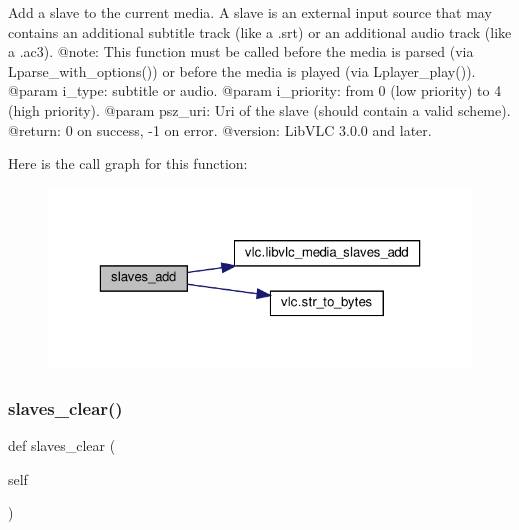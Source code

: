 \begin{DoxyVerb}Add a slave to the current media.
A slave is an external input source that may contains an additional subtitle
track (like a .srt) or an additional audio track (like a .ac3).
@note: This function must be called before the media is parsed (via
L{parse_with_options}()) or before the media is played (via
L{player_play}()).
@param i_type: subtitle or audio.
@param i_priority: from 0 (low priority) to 4 (high priority).
@param psz_uri: Uri of the slave (should contain a valid scheme).
@return: 0 on success, -1 on error.
@version: LibVLC 3.0.0 and later.
\end{DoxyVerb}
 Here is the call graph for this function\+:
\nopagebreak
\begin{figure}[H]
\begin{center}
\leavevmode
\includegraphics[width=323pt]{classvlc_1_1_media_af2aadb97fb0c589f6c40c144679ad927_cgraph}
\end{center}
\end{figure}
\mbox{\label{classvlc_1_1_media_a817ad40337d0e94ee7fffaa07b93d40a}} 
\subsubsection{\texorpdfstring{slaves\+\_\+clear()}{slaves\_clear()}}
{\footnotesize\ttfamily def slaves\+\_\+clear (\begin{DoxyParamCaption}\item[{}]{self }\end{DoxyParamCaption})}

